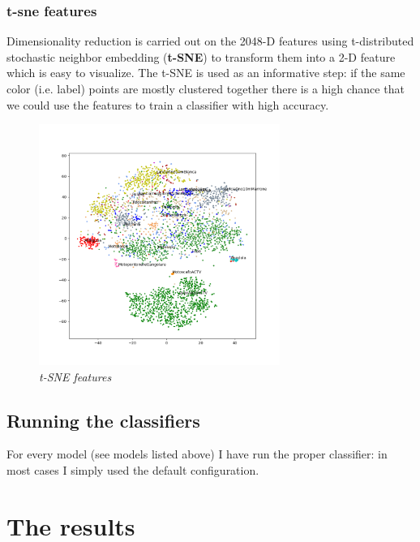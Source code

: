 \documentclass[12pt]{article}
\begin{document}
\subsubsection{t-sne features}
Dimensionality reduction is carried out on the 2048-D features using t-distributed stochastic neighbor embedding (\textbf{t-SNE}) to transform them into a 2-D feature which is easy to visualize. The t-SNE is used as an informative step: if the same color (i.e. label) points are mostly clustered together there is a high chance that we could use the features to train a classifier with high accuracy.

\begin{figure}[!ht]
	\centering %
	\includegraphics[width=0.7\textwidth]{../code/output/features.png} %
	\caption{\textit{t-SNE features}} %
	\label{fig:2dh}
\end{figure}

\subsection{Running the classifiers}
For every model (see models listed above) I have run the proper classifier: in most cases I simply used the default configuration.

\section{The results}
\label{sec:results}
\end{document}
